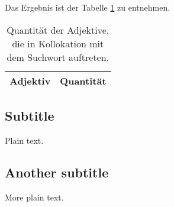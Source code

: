 \documentclass[%
	type=document,%
  	style=article,%
  	media=print,
  	pages=oneside,%
  	prefixLecturer=Dozenten:,
  	author=multiple,
]{unihildesheim}
\begin{document}
Das Ergebnis ist der Tabelle \ref{tab:adj_mpraes} zu entnehmen.
\begin{table}[htpb]\label{t}
	\center
	\begin{tabularx}{0.5\textwidth}{lr}
		\toprule
		\textbf{Adjektiv} & \textbf{Quantität}\\
		\midrule
		
		\bottomrule
	\end{tabularx}
	\caption{Quantität der Adjektive, die in Kollokation mit dem Suchwort
	auftreten.}
	\label{tab:adj_mpraes}
\end{table}

\subsection{Subtitle}

Plain text.

\subsection{Another subtitle}

More plain text.
\end{document}
